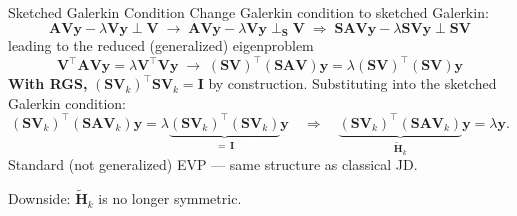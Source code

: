 \documentclass[xcolor=dvipsnames,10pt]{beamer}
\renewcommand{\vec}[1]{\bm{#1}}
\newcommand{\mat}[1]{\bm{#1}}
\begin{document}
\begin{frame}{Sketched Galerkin Condition}
Change Galerkin condition to sketched Galerkin:
\begin{equation*}
  \mat{AV}\vec{y}-\lambda\mat{V}\vec{y}\perp\mat{V}
  \;\rightarrow\;
  \mat{AV}\vec{y}-\lambda\mat{V}\vec{y}\perp_{\mat{S}}\mat{V}
  \;\Rightarrow\;
  \mat{SAV}\vec{y}-\lambda\mat{SV}\vec{y}\perp\mat{SV}
\end{equation*}
\pause
leading to the reduced (generalized) eigenproblem
\begin{equation*}
  \mat{V}^\top\mat{AV}\vec{y}=\lambda\mat{V}^\top\mat{V}\vec{y}
  \;\rightarrow\;
  (\mat{SV})^\top(\mat{SAV})\vec{y}
  =\lambda(\mat{SV})^\top(\mat{SV})\vec{y}
\end{equation*}
\pause
\textbf{With RGS,} $(\mat{SV}_k)^\top\mat{SV}_k=\mat{I}$ by construction.
Substituting into the sketched Galerkin condition:
\begin{equation*}
  (\mat{SV}_k)^\top(\mat{SAV}_k)\vec{y}
  = \lambda\underbrace{(\mat{SV}_k)^\top(\mat{SV}_k)}_{=\,\mat{I}}\vec{y}
  \quad\Longrightarrow\quad
  \underbrace{(\mat{SV}_k)^\top(\mat{SAV}_k)}_{\tilde{\mat{H}}_k}\vec{y}
  = \lambda\vec{y}.
\end{equation*}
Standard (not generalized) EVP --- same structure as classical JD.

Downside: $\tilde{\mat{H}}_k$ is no longer symmetric.

\end{frame}
\end{document}
